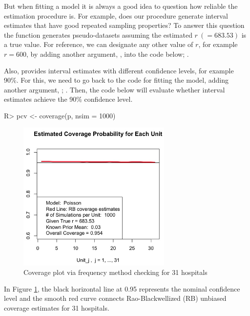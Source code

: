 \documentclass[article]{jss}
\begin{document}
But when fitting a model it is always a good idea to question how reliable the estimation procedure is. For example, does our procedure generate interval estimates that have good repeated sampling properties? To answer this question the  function generates pseudo-datasets assuming the estimated $r~(=683.53)$ is a true value. For reference, we can designate any other value of $r$, for example $r=600$, by adding another argument, , into the code below; .



Also,  provides interval estimates with different confidence levels, for example 90\%. For this, we need to go back to the code for fitting the model, adding another argument, ; .  Then, the code below will evaluate whether interval estimates achieve the 90\% confidence level.

\begin{CodeChunk}
\begin{CodeInput}
R> pcv <- coverage(p, nsim = 1000)
\end{CodeInput}
\end{CodeChunk}
\begin{figure}[h] 
\begin{center}
\includegraphics[width = 3in]{hospital2.png}
\caption{Coverage plot via frequency method checking for 31 hospitals}
\label{fig:hospitalcoverage}
\end{center}
\end{figure}

In Figure \ref{fig:hospitalcoverage}, the black horizontal line at 0.95 represents the nominal confidence level and the smooth red curve connects Rao-Blackwellized (RB) unbiased coverage estimates for 31 hospitals.
\end{document}
